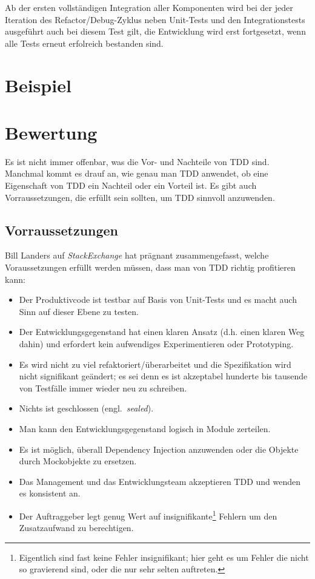 \documentclass[a4paper,10pt]{scrartcl}
\newcommand{\pje}{\marginpar{Philipp\\Jeske}}
\newcommand{\bmn}{\marginpar{Benjamin\\Morgan}}
\begin{document}
Ab der ersten vollständigen Integration aller Komponenten wird bei der jeder
Iteration des Refactor/Debug-Zyklus neben Unit-Tests und den Integrationstests
ausgeführt auch bei diesem Test gilt, die Entwicklung wird erst fortgesetzt,
wenn alle Tests erneut erfolreich bestanden sind.

\section{Beispiel}\label{Beispiel}\pje

\section{Bewertung}\label{Bewertung}\bmn
Es ist nicht immer offenbar, was die Vor- und Nachteile von TDD sind. Manchmal
kommt es drauf an, wie genau man TDD anwendet, ob eine Eigenschaft von TDD
ein Nachteil oder ein Vorteil ist. Es gibt auch Vorraussetzungen, die erfüllt
sein sollten, um TDD sinnvoll anzuwenden.

\subsection{Vorraussetzungen}\label{Vorraussetzungen}
Bill Landers auf \emph{StackExchange} \cite{StackExchange} hat prägnant
zusammengefasst, welche Voraussetzungen erfüllt werden müssen, dass man von TDD
richtig profitieren kann:

\begin{itemize}
    \item Der Produktivcode ist testbar auf Basis von Unit-Tests und es macht auch
        Sinn auf dieser Ebene zu testen.
    \item Der Entwicklungsgegenstand hat einen klaren Ansatz (d.h. einen klaren
        Weg dahin) und erfordert kein aufwendiges Experimentieren oder
        Prototyping.
    \item Es wird nicht zu viel refaktoriert/überarbeitet und die Spezifikation
        wird nicht signifikant geändert; es sei denn es ist akzeptabel hunderte
        bis tausende von Testfälle immer wieder neu zu schreiben.
    \item Nichts ist geschlossen (engl.\ \emph{sealed}).
    \item Man kann den Entwicklungsgegenstand logisch in Module zerteilen.
    \item Es ist möglich, überall Dependency Injection anzuwenden oder die
        Objekte durch Mockobjekte zu ersetzen.
    \item Das Management und das Entwicklungsteam akzeptieren TDD und wenden es
        konsistent an.
    \item Der Auftraggeber legt genug Wert auf insignifikante\footnote{Eigentlich
        sind fast keine Fehler insignifikant; hier geht es um Fehler die nicht
        so gravierend sind, oder die nur sehr selten auftreten.} Fehlern um den
        Zusatzaufwand zu berechtigen.
\end{itemize}
\end{document}
